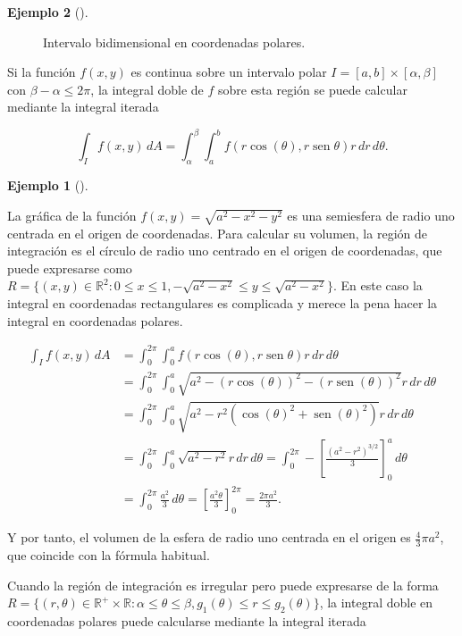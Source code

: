 \documentclass[
  a4paper,
]{scrreport}
\theoremstyle{definition}
\newtheorem{example}{Ejemplo}[chapter]
\theoremstyle{plain}
\theoremstyle{definition}
\theoremstyle{definition}
\theoremstyle{plain}
\theoremstyle{plain}
\theoremstyle{remark}
\begin{document}
\begin{example}[]
\begin{figure}[H]
{}

\caption{Intervalo bidimensional en coordenadas polares.}

\end{figure}%

Si la función \(f(x,y)\) es continua sobre un intervalo polar
\(I=[a,b]\times[\alpha,\beta]\) con \(\beta-\alpha\leq 2\pi\), la
integral doble de \(f\) sobre esta región se puede calcular mediante la
integral iterada

\[
\int_I f(x,y)\,dA 
= \int_{\alpha}^{\beta}\int_a^b f(r\cos(\theta),r\operatorname{sen}{\theta})r\,dr\,d\theta.
\]

\begin{example}[]\protect\hypertarget{exm-volumen-esfera}{}\label{exm-volumen-esfera}

La gráfica de la función \(f(x,y)=\sqrt{a^2-x^2-y^2}\) es una semiesfera
de radio uno centrada en el origen de coordenadas. Para calcular su
volumen, la región de integración es el círculo de radio uno centrado en
el origen de coordenadas, que puede expresarse como
\(R=\{(x,y)\in\mathbb{R}^2: 0\leq x\leq 1, -\sqrt{a^2-x^2}\leq y\leq \sqrt{a^2-x^2}\}\).
En este caso la integral en coordenadas rectangulares es complicada y
merece la pena hacer la integral en coordenadas polares.

\begin{align*}
\int_I f(x,y)\,dA 
&= \int_0^{2\pi}\int_0^a f(r\cos(\theta),r\operatorname{sen}{\theta})r\,dr\,d\theta \\
&= \int_0^{2\pi}\int_0^a \sqrt{a^2-(r\cos(\theta))^2-(r\operatorname{sen}(\theta))^2}r\,dr\,d\theta \\
&= \int_0^{2\pi}\int_0^a \sqrt{a^2-r^2(\cos(\theta)^2+\operatorname{sen}(\theta)^2)}r\,dr\,d\theta \\
&= \int_0^{2\pi}\int_0^a  \sqrt{a^2-r^2}r\,dr\,d\theta 
= \int_0^{2\pi} -\left[\frac{(a^2-r^2)^{3/2}}{3}\right]_0^a\,d\theta \\
&= \int_0^{2\pi} \frac{a^2}{3}\,d\theta 
= \left[\frac{a^2\theta}{3}\right]_0^{2\pi}
= \frac{2\pi a^2}{3}.
\end{align*}

Y por tanto, el volumen de la esfera de radio uno centrada en el origen
es \(\frac{4}{3}\pi a^2\), que coincide con la fórmula habitual.

\end{example}

Cuando la región de integración es irregular pero puede expresarse de la
forma
\(R=\{(r,\theta)\in \mathbb{R}^+\times \mathbb{R}: \alpha\leq \theta\leq \beta, g_1(\theta)\leq r\leq g_2(\theta)\}\),
la integral doble en coordenadas polares puede calcularse mediante la
integral iterada


\end{example}
\end{document}
